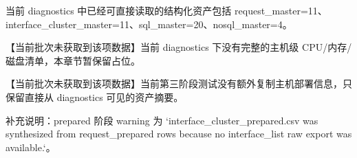 


当前 diagnostics 中已经可直接读取的结构化资产包括 request\_master=11、interface\_cluster\_master=11、sql\_master=20、nosql\_master=4。\par


【当前批次未获取到该项数据】当前 diagnostics 下没有完整的主机级 CPU/内存/磁盘清单，本章节暂保留占位。\par


【当前批次未获取到该项数据】当前第三阶段测试没有额外复制主机部署信息，只保留直接从 diagnostics 可见的资产摘要。\par

补充说明：prepared 阶段 warning 为 `interface\_cluster\_prepared.csv was synthesized from request\_prepared rows because no interface\_list raw export was available.`。\par
